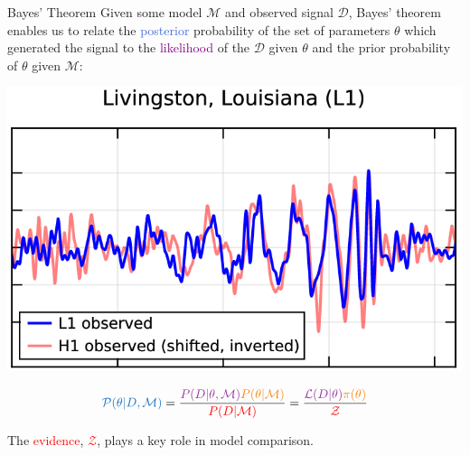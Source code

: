 \documentclass[aspectratio=169]{beamer}
\begin{document}
\begin{frame}{Bayes' Theorem}\vfill
    Given some model $\mathcal{M}$ and observed signal $\mathcal{D}$, Bayes' theorem enables us to relate the \textcolor{RoyalBlue}{posterior} probability of the set of parameters $\theta$ which generated the signal to the \textcolor{Purple}{likelihood} of the $\mathcal{D}$ given $\theta$ and the \textcolor{BurntOrange}{prior} probability of $\theta$ given $\mathcal{M}$:

\vfill
\begin{minipage}{0.3\textwidth}
    \includegraphics[width=\textwidth]{Ca_Foscari Beamer/gw_example.png.png}
\end{minipage}\hspace{2em}
\begin{minipage}{0.6\textwidth}
\begin{equation}
    \textcolor{RoyalBlue}{\mathcal{P}(\theta | D, \mathcal{M})} = \frac{\textcolor{Purple}{P(D | \theta, \mathcal{M})} \textcolor{BurntOrange}{P(\theta | \mathcal{M})}}{\textcolor{red}{P(D | \mathcal{M})}} = \frac{\textcolor{Purple}{\mathcal{L}(D | \theta)} \textcolor{BurntOrange}{\pi(\theta)}}{\textcolor{red}{\mathcal{Z}}}
\end{equation}
\end{minipage}
\vfill
The \textcolor{red}{evidence}, \textcolor{red}{$\mathcal{Z}$}, plays a key role in model comparison.
\end{frame}
\end{document}
